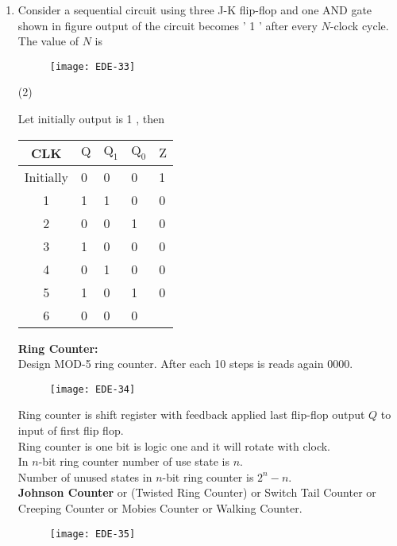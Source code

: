 \begin{enumerate}
\begin{answer}
\end{answer}
\item Consider a sequential circuit using three J-K flip-flop and one AND gate shown in figure output of the circuit becomes ' 1 ' after every $N$-clock cycle. The value of $N$ is
\begin{figure}[H]
	\centering
	\texttt{[image: EDE-33]}
\end{figure}
 \begin{tasks}(2)
\end{tasks}
\begin{answer}
Let initially output is 1 , then\\
\begin{tabular}{|cllll|}
	\hline CLK & $\mathrm{Q}$ & $\mathrm{Q}_{1}$ & $\mathrm{Q}_{0}$ & $\mathrm{Z}$ \\
	\hline Initially & 0 & 0 & 0 & 1 \\
	\hline 1 & 1 & 1 & 0 & 0 \\
	2 & 0 & 0 & 1 & 0 \\
	3 & 1 & 0 & 0 & 0 \\
	4 & 0 & 1 & 0 & 0 \\
	5 & 1 & 0 & 1 & 0 \\
	6 & 0 & 0 & 0 & \\
	\hline
\end{tabular}
\end{answer}
\textbf{Ring Counter:}\\
Design MOD-5 ring counter. After each 10 steps is reads again 0000.
\begin{figure}[H]
	\centering
	\texttt{[image: EDE-34]}
\end{figure}
Ring counter is shift register with feedback applied last flip-flop output $Q$ to input of first flip flop.\\
Ring counter is one bit is logic one and it will rotate with clock.\\
In $n$-bit ring counter number of use state is $n$.\\
Number of unused states in $n$-bit ring counter is $2^{n}-n$.\\
\textbf{Johnson Counter } or (Twisted Ring Counter) or Switch Tail Counter or Creeping Counter or Mobies Counter or Walking Counter.
\begin{figure}[H]
	\centering
	\texttt{[image: EDE-35]}
\end{figure}

\end{enumerate}
